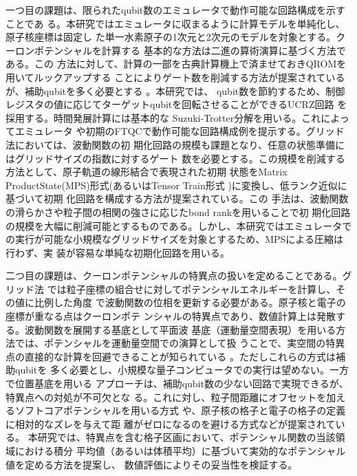 \documentclass[wabun2025.tex]{subfiles}
\begin{document}
一つ目の課題は、限られたqubit数のエミュレータで動作可能な回路構成を示すことであ
る。本研究ではエミュレータに収まるように計算モデルを単純化し、原子核座標は固定し
た単一水素原子の1次元と2次元のモデルを対象とする。クーロンポテンシャルを計算する
基本的な方法は二進の算術演算に基づく方法である\cite{Zalka-rspa.1998.0162}。この
方法に対して、計算の一部を古典計算機上で済ませておきQROMを用いてルックアップする
ことによりゲート数を削減する方法が提案されているが、補助qubitを多く必要とする
\cite{Sanders2020.PRXQuantum.1.020312}。本研究では、 qubit数を節約するため、制御
レジスタの値に応じてターゲットqubitを回転させることができるUCRZ回路
\cite{Mottonen2004.PhysRevLett.93.130502}を採用する。時間発展計算には基本的な
Suzuki-Trotter分解を用いる\cite{Zalka-rspa.1998.0162}。これによってエミュレータ
や初期のFTQCで動作可能な回路構成例を提示する。グリッド法においては、波動関数の初
期化回路の規模も課題となり、任意の状態準備にはグリッドサイズの指数に対するゲート
数を必要とする。この規模を削減する方法として、原子軌道の線形結合で表現された初期
状態をMatrix ProductState(MPS)形式(あるいはTensor Train形式
\cite{Oseledets2011.doi:10.1137/090752286})に変換し、低ランク近似に基づいて初期
化回路を構成する方法が提案されている\cite{Huggins2025.PRXQuantum.6.020319}。この
手法は、波動関数の滑らかさや粒子間の相関の強さに応じたbond rankを用いることで初
期化回路の規模を大幅に削減可能とするものである。しかし、本研究ではエミュレータで
の実行が可能な小規模なグリッドサイズを対象とするため、MPSによる圧縮は行わず、実
装が容易な単純な初期化回路を用いる。

二つ目の課題は、クーロンポテンシャルの特異点の扱いを定めることである。グリッド法
では粒子座標の組合せに対してポテンシャルエネルギーを計算し、その値に比例した角度
で波動関数の位相を更新する必要がある。原子核と電子の座標が重なる点はクーロンポテ
ンシャルの特異点であり、数値計算上は発散する。波動関数を展開する基底として平面波
基底（運動量空間表現）を用いる方法では、ポテンシャルを運動量空間での演算として扱
うことで、実空間の特異点の直接的な計算を回避できることが知られている
\cite{Babbush_2019, eklund2026.arXiv2603.19007}。ただしこれらの方式は補助qubitを
多く必要とし、小規模な量子コンピュータでの実行は望めない。一方で位置基底を用いる
アプローチは、補助qubit数の少ない回路で実現できるが、特異点への対処が不可欠とな
る。これに対し、粒子間距離にオフセットを加えるソフトコアポテンシャルを用いる方式
\cite{Kivlichan_2017}や、原子核の格子と電子の格子の定義に相対的なズレを与えて距
離がゼロになるのを避ける方式\cite{Chan2023.sciadv.abo7484}などが提案されている。
本研究では、特異点を含む格子区画において、ポテンシャル関数の当該領域における積分
平均値（あるいは体積平均）に基づいて実効的なポテンシャル値を定める方法を提案し、
数値評価によりその妥当性を検証する。
\end{document}
